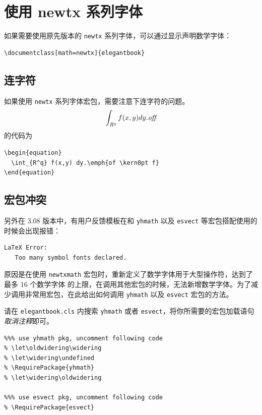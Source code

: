 \documentclass[lang=cn,10pt,cite=super]{elegantbook}
\begin{document}
\section{使用 newtx 系列字体}

如果需要使用原先版本的 \lstinline{newtx} 系列字体，可以通过显示声明数学字体：

\begin{lstlisting}
\documentclass[math=newtx]{elegantbook}
\end{lstlisting}

\subsection{连字符}

如果使用 \lstinline{newtx} 系列字体宏包，需要注意下连字符的问题。
\begin{equation}
  \int_{R^q} f(x,y) dy.\emph{of\kern0pt f}
\end{equation}
的代码为
\begin{lstlisting}
\begin{equation}
  \int_{R^q} f(x,y) dy.\emph{of \kern0pt f}
\end{equation}
\end{lstlisting}

\subsection{宏包冲突}

另外在 3.08 版本中，有用户反馈模板在和 \lstinline{yhmath} 以及 \lstinline{esvect} 等宏包搭配使用的时候会出现报错：
\begin{lstlisting}
LaTeX Error:
   Too many symbol fonts declared.
\end{lstlisting}

原因是在使用 \lstinline{newtxmath} 宏包时，重新定义了数学字体用于大型操作符，达到了 {\heiti 最多 16 个数学字体} 的上限，在调用其他宏包的时候，无法新增数学字体。为了减少调用非常用宏包，在此给出如何调用 \lstinline{yhmath} 以及 \lstinline{esvect} 宏包的方法。

请在 \lstinline{elegantbook.cls} 内搜索 \lstinline{yhmath} 或者 \lstinline{esvect}，将你所需要的宏包加载语句\textit{取消注释}即可。
\begin{lstlisting}
%%% use yhmath pkg, uncomment following code
% \let\oldwidering\widering
% \let\widering\undefined
% \RequirePackage{yhmath}
% \let\widering\oldwidering

%%% use esvect pkg, uncomment following code
% \RequirePackage{esvect}
\end{lstlisting}
\end{document}
